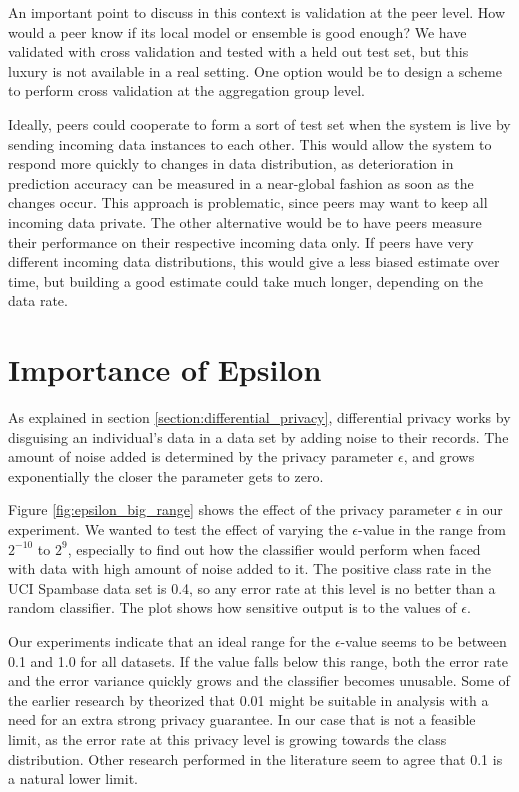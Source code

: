 An important point to discuss in this context is validation at the peer level. How would a peer know if its local model or ensemble is good enough? We have validated with cross validation and tested with a held out test set, but this luxury is not available in a real setting. One option would be to design a scheme to perform cross validation at the aggregation group level.

Ideally, peers could cooperate to form a sort of test set when the system is live by sending incoming data instances to each other. This would allow the system to respond more quickly to changes in data distribution, as deterioration in prediction accuracy can be measured in a near-global fashion as soon as the changes occur. This approach is problematic, since peers may want to keep all incoming data private. The other alternative would be to have peers measure their performance on their respective incoming data only. If peers have very different incoming data distributions, this would give a less biased estimate over time, but building a good estimate could take much longer, depending on the data rate.



\section{Importance of Epsilon}
As explained in section \ref{section:differential_privacy}, differential privacy works by disguising an individual's data in a data set by adding noise to their records. The amount of noise added is determined by the privacy parameter  $\epsilon$, and grows exponentially the closer the parameter gets to zero. 

 
Figure \ref{fig:epsilon_big_range} shows the effect of the privacy parameter $\epsilon$ in our experiment. We wanted to test the effect of varying the $\epsilon$-value in the range from $2^{-10}$ to $2^9$, especially to find out how the classifier would perform when faced with data with high amount of noise added to it. The positive class rate in the UCI Spambase data set is 0.4, so any error rate at this level is no better than a random classifier. The plot shows how sensitive output is to the values of $\epsilon$.

Our experiments indicate that an ideal range for the $\epsilon$-value seems to be between 0.1 and 1.0 for all datasets. If the value falls below this range, both the error rate and the error variance quickly grows and the classifier becomes unusable. Some of the earlier research by \cite{dwork2008differential} theorized that 0.01 might be suitable in analysis with a need for an extra strong privacy guarantee. In our case that is not a feasible limit, as the error rate at this privacy level is growing towards the class distribution. Other research performed in the literature \cite{pathak2010diffprivhomo,kellaris2013groupingSmoothing,hsu2014economicEpsilon} seem to agree that 0.1 is a natural lower limit.   


